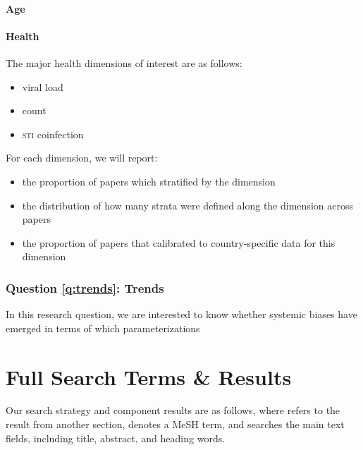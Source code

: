 \documentclass{article}
\begin{document}
\paragraph{Age}
\paragraph{Health}
The major health dimensions of interest are as follows:
\begin{itemize}[topsep=0pt]
  \item \hiv viral load
  \item \cdf count
  \item \textsc{sti} coinfection
\end{itemize}
For each dimension, we will report:
\begin{itemize}[topsep=0pt]
  \item the proportion of papers which stratified by the dimension
  \item the distribution of how many strata were defined along the dimension across papers
  \item the proportion of papers that calibrated to country-specific data for this dimension
\end{itemize}
\subsubsection{Question \ref{q:trends}: Trends}
In this research question, we are interested to know whether
systemic biases have emerged in terms of which parameterizations

\clearpage
\printbibliography
\clearpage
\appendix
\section{Full Search Terms \& Results}\label{app:search}
Our search strategy and component results are as follows, where
\searchtext{[section]} refers to the result from another section,
 denotes a MeSH term, and
 searches the main text fields, including
title, abstract, and heading words.
\small
\end{document}
